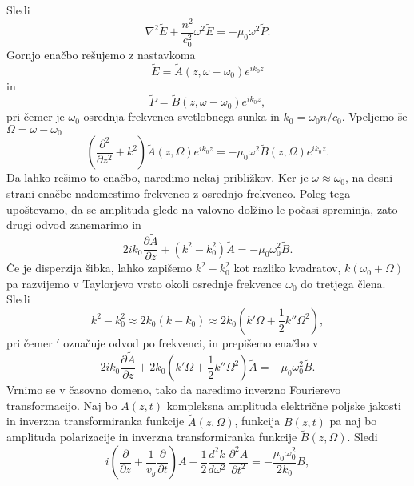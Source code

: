 Sledi
\begin{equation}
\nabla^{2}\tilde{E}+\frac{n^2}{c_0^{2}}\omega^2 \tilde{E}=
- \mu_{0}\omega^2 \tilde{P}.
\end{equation}
Gornjo enačbo rešujemo z nastavkoma
\begin{equation}
\tilde{E} = \tilde{A} (z,\omega - \omega_0) e^{ik_0z}
\end{equation}
in 
\begin{equation}
 \tilde{P} = \tilde{B} (z,\omega - \omega_0) e^{ik_0z},
\end{equation}
pri čemer je $\omega_0$ osrednja frekvenca svetlobnega sunka in $k_0 = \omega_0 n/c_0$. Vpeljemo še
$\Omega =\omega - \omega_0$
\begin{equation}
\left(\frac{\partial^2}{\partial z^2}+k^2\right)\tilde{A}(z,\Omega) e^{ik_0z} =
- \mu_{0}\omega^2 \tilde{B} (z,\Omega) e^{ik_0z}.
\end{equation}
Da lahko rešimo to enačbo, naredimo nekaj približkov. Ker je $\omega \approx \omega_0$, na desni strani
enačbe nadomestimo frekvenco z osrednjo frekvenco. Poleg tega upoštevamo, da se amplituda 
glede na valovno dolžino le počasi spreminja, zato drugi odvod zanemarimo in 
\begin{equation}
2 i k_0 \frac{\partial \tilde{A}}{\partial z} + (k^2-k_0^2) \tilde{A} = - \mu_{0}\omega_0^2 \tilde{B}.
\end{equation}
Če je disperzija šibka, lahko zapišemo $k^2 - k_0^2$ kot razliko kvadratov, $k(\omega_0 + \Omega)$ pa 
razvijemo v Taylorjevo vrsto okoli osrednje frekvence $\omega_0$ do tretjega člena. Sledi
\begin{equation}
k^2 - k_0^2 \approx 2k_0 (k-k_0) \approx 2k_0 (k'\Omega + \frac{1}{2}k''\Omega^2),
\end{equation}
pri čemer $'$ označuje odvod po frekvenci, in prepišemo enačbo v 
\begin{equation}
2 i k_0 \frac{\partial \tilde{A}}{\partial z} + 2k_0(k'\Omega + \frac{1}{2}k''\Omega^2) \tilde{A} 
= - \mu_{0}\omega_0^2 \tilde{B}.
\end{equation}
Vrnimo se v časovno domeno, tako da naredimo inverzno Fourierevo transformacijo. Naj bo 
$A(z,t)$ kompleksna amplituda električne poljske jakosti in inverzna transformiranka 
funkcije $\tilde{A}(z,\Omega)$, funkcija $B(z,t)$ pa naj bo 
amplituda polarizacije in inverzna transformiranka 
funkcije $\tilde{B}(z,\Omega)$.
Sledi
\begin{equation}
i (\frac{\partial}{\partial z}+\frac{1}{v_{g}}\frac{\partial}{\partial t})A-
\frac{1}{2}\frac{d^{2}k}{d\omega^{2}}\,\frac{\partial^{2}A}{\partial t^{2}}=
-\frac{\mu_0\omega_0^2}{2 k_0}B,
\label{8.93}
\end{equation}
